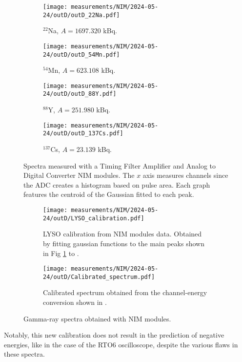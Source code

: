 \begin{figure}[H]
  \begin{subfigure}[t]{0.47\textwidth}
    \centering
    \texttt{[image: measurements/NIM/2024-05-24/outD/outD\_22Na.pdf]}
    \caption{\label{sfig:NIM_22Na}$^{22}$Na, $A=1697.320$ kBq.}
  \end{subfigure}
  \hfill
  \begin{subfigure}[t]{0.47\textwidth}
    \centering
    \texttt{[image: measurements/NIM/2024-05-24/outD/outD\_54Mn.pdf]}
    \caption{\label{sfig:NIM_54Mn}$^{54}$Mn, $A=623.108$ kBq.}
  \end{subfigure}
  \medskip
  \begin{subfigure}[t]{0.47\textwidth}
    \centering
    \texttt{[image: measurements/NIM/2024-05-24/outD/outD\_88Y.pdf]}
    \caption{\label{sfig:NIM_88Y}$^{88}$Y, $A=251.980$ kBq.}
  \end{subfigure}
  \hfill
  \begin{subfigure}[t]{0.47\textwidth}
    \centering
    \texttt{[image: measurements/NIM/2024-05-24/outD/outD\_137Cs.pdf]}
    \caption{\label{sfig:NIM_137Cs}$^{137}$Cs, $A=23.139$ kBq.}
  \end{subfigure}
  \caption{\label{fig:NIM_spectra}Spectra measured with a Timing Filter Amplifier and Analog to Digital Converter NIM modules. The $x$ axis measures channels since the ADC creates a histogram based on pulse area. Each graph features the centroid of the Gaussian fitted to each peak.}
\end{figure}

\begin{figure}[H]
  \begin{subfigure}[t]{\textwidth}
    \centering
    \texttt{[image: measurements/NIM/2024-05-24/outD/LYSO\_calibration.pdf]}
    \caption{\label{sfig:NIM_LYSO_calibration}LYSO calibration from NIM modules data. Obtained by fitting gaussian functions to the main peaks shown in Fig \ref{sfig:NIM_22Na} to .}
  \end{subfigure}
  \medskip
  \begin{subfigure}[t]{\textwidth}
    \centering
    \texttt{[image: measurements/NIM/2024-05-24/outD/Calibrated\_spectrum.pdf]}
    \caption{\label{sfig:NIM_LYSO_calibrated_spectrum}Calibrated spectrum obtained from the channel-energy conversion shown in .}
  \end{subfigure}
  \caption{\label{fig:NIM_calibration}Gamma-ray spectra obtained with NIM modules.}
\end{figure}

Notably, this new calibration does not result in the prediction of negative energies, like in the case of the RTO6 oscilloscope, despite the various flaws in these spectra.